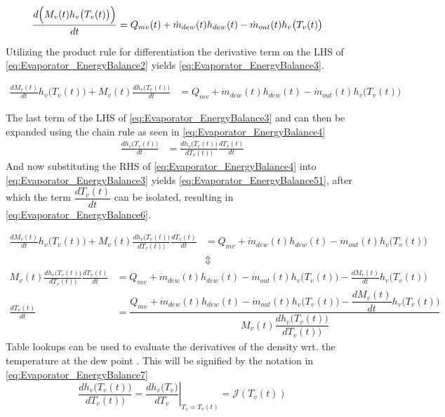 \begin{align}
	\frac{ d\Bigl(M_{v}(t) h_v \bigl(T_v(t)\bigr) \Bigr)}{dt} & = Q_{mv}(t) + \dot{m}_{dew}(t)h_{dew}(t) - \dot{m}_{out}(t)h_v\bigl(T_v(t)\bigr)		\label{eq:Evaporator_EnergyBalance2}
\end{align}

Utilizing the product rule for differentiation the derivative term on the LHS of \cref{eq:Evaporator_EnergyBalance2} yields \cref{eq:Evaporator_EnergyBalance3}.


\begin{align}
	\frac{ dM_{v}(t)}{dt} h_v\bigl(T_v(t)\bigr) + M_{v}(t) \frac{ dh_v \bigl(T_v(t)\bigr)}{dt}  & = Q_{mv} + \dot{m}_{dew}(t)h_{dew}(t) - \dot{m}_{out}(t)h_v\bigl(T_{v}(t)\bigr)		\label{eq:Evaporator_EnergyBalance3}
\end{align}

The last term of the LHS of \cref{eq:Evaporator_EnergyBalance3} and can then be expanded using the chain rule as seen in \cref{eq:Evaporator_EnergyBalance4}
\begin{align}
	\frac{ dh_v \bigl(T_v(t)\bigr)}{dt}  & = \frac{ dh_v \bigl(T_{v}(t)\bigr)}{dT_v(t))} \frac{dT_v(t)}{dt}	\label{eq:Evaporator_EnergyBalance4} 
\end{align}
And now substituting the RHS of \cref{eq:Evaporator_EnergyBalance4} into \cref{eq:Evaporator_EnergyBalance3} yields \cref{eq:Evaporator_EnergyBalance51}, after which the term $ \dfrac{dT_v(t)}{dt} $ can be isolated, resulting in \cref{eq:Evaporator_EnergyBalance6}.

\begin{align}
	\frac{dM_{v}(t)}{dt} h_v\bigl(T_v(t)\bigr) + M_{v}(t) \frac{ dh_v \bigl(T_v(t)\bigr)}{dT_v(t))} \frac{dT_v(t)}{dt}  & = Q_{mv} + \dot{m}_{dew}(t)h_{dew}(t) - \dot{m}_{out}(t)h_v\bigl(T_{v}(t)\bigr) \label{eq:Evaporator_EnergyBalance51}	\\
	& \Updownarrow \nonumber
\end{align}
\begin{align}
	 M_{v}(t) \frac{ dh_v \bigl(T_v(t)\bigr)}{dT_v(t))} \frac{dT_v(t)}{dt}  & = Q_{mv} + \dot{m}_{dew}(t)h_{dew}(t) - \dot{m}_{out}(t)h_v\bigl(T_{v}(t)\bigr) - \frac{dM_{v}(t)}{dt} h_v\bigl(T_v(t)\bigr)  \label{eq:Evaporator_EnergyBalance5} \\
	 \frac{dT_v(t)}{dt}  & = \dfrac{Q_{mv} + \dot{m}_{dew}(t)h_{dew}(t) - \dot{m}_{out}(t)h_v\bigl(T_{v}(t)\bigr) - \dfrac{dM_{v}(t)}{dt} h_v\bigl(T_v(t)\bigr)}{M_{v}(t) \dfrac{ dh_v \bigl(T_v(t)\bigr)}{dT_v(t))} }  \label{eq:Evaporator_EnergyBalance6}
\end{align}
Table lookups can be used to evaluate the derivatives of the density wrt. the temperature at the dew point . This will be signified by the notation in \cref{eq:Evaporator_EnergyBalance7} 
\begin{equation}
	 \dfrac{ dh_v \bigl(T_v(t)\bigr)}{dT_v(t))} = \left. \dfrac{ dh_v \bigl(T_v\bigr)}{dT_v} \right |_{T_v = T_{v}(t)}= \mathcal{J}(T_v(t)) \label{eq:Evaporator_EnergyBalance7}
\end{equation}

